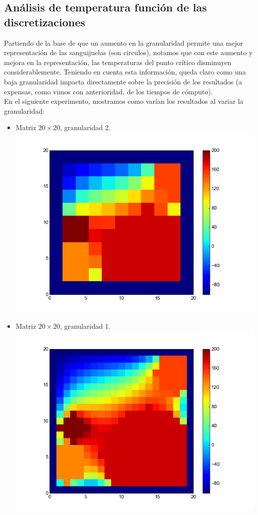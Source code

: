 \subsection{An\'alisis de temperatura funci\'on de las discretizaciones}
Partiendo de la base de que un aumento en la granularidad permite una mejor representaci\'on de las sanguijuelas (son circulos), notamos que con este aumento y mejora en la representaci\'on, las temperaturas del punto cr\'itico disminuyen considerablemente. Teniendo en cuenta esta informaci\'on, queda claro como una baja granularidad impacta directamente sobre la precisi\'on de los resultados (a expensas, como vimos con anterioridad, de los tiempos de c\'omputo).
\\
En el siguiente experimento, mostramos como varían los resultados al variar la granularidad:
\begin{itemize}
 \item Matriz $20 \times 20$, granularidad 2.\\
  \includegraphics[width=400pt]{imagenes/imagen11.png}

 \item Matriz $20 \times 20$, granularidad 1.\\
  \includegraphics[width=400pt]{imagenes/imagen21.png}


\end{itemize}
